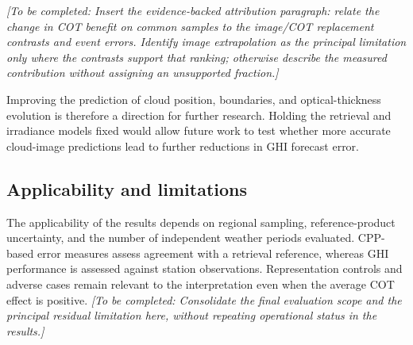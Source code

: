 \documentclass[11pt]{article}
\newcommand{\pending}[1]{\textit{[To be completed: #1]}}
\begin{document}
\pending{Insert the evidence-backed attribution paragraph: relate the change in COT benefit on common samples to the image/COT replacement contrasts and event errors. Identify image extrapolation as the principal limitation only where the contrasts support that ranking; otherwise describe the measured contribution without assigning an unsupported fraction.}

Improving the prediction of cloud position, boundaries, and optical-thickness evolution is therefore a direction for further research. Holding the retrieval and irradiance models fixed would allow future work to test whether more accurate cloud-image predictions lead to further reductions in GHI forecast error.

\subsection{Applicability and limitations}
The applicability of the results depends on regional sampling, reference-product uncertainty, and the number of independent weather periods evaluated. CPP-based error measures assess agreement with a retrieval reference, whereas GHI performance is assessed against station observations. Representation controls and adverse cases remain relevant to the interpretation even when the average COT effect is positive. \pending{Consolidate the final evaluation scope and the principal residual limitation here, without repeating operational status in the results.}
\end{document}

